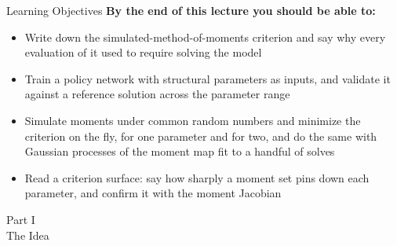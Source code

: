 \documentclass[aspectratio=169,11pt]{beamer}
\begin{document}
\begin{frame}{Learning Objectives}
\textbf{By the end of this lecture you should be able to:}
\begin{itemize}\itemsep4pt
  \item Write down the simulated-method-of-moments criterion and say why every evaluation of it used to require solving the model
  \item Train a policy network with structural parameters as inputs, and validate it against a reference solution across the parameter range
  \item Simulate moments under common random numbers and minimize the criterion on the fly, for one parameter and for two, and do the same with Gaussian processes of the moment map fit to a handful of solves
  \item Read a criterion surface: say how sharply a moment set pins down each parameter, and confirm it with the moment Jacobian
\end{itemize}
\end{frame}


\begin{frame}{}
\begin{center}
{\Huge \textcolor{uzhblue}{Part I}}\\[0.8em]
{\LARGE The Idea}
\end{center}
\end{frame}
\end{document}
